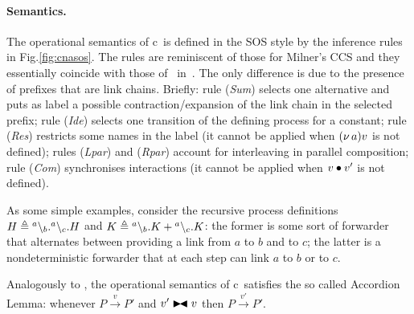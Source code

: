 \paragraph{Semantics.}

The operational semantics of c\CNA\ is defined in the SOS style by the inference rules in Fig.\ref{fig:cnasos}. The rules are reminiscent of those for Milner's CCS and they essentially coincide with those of \CNA\ in~\cite{BBB17}. The only difference is due to the presence of prefixes that are link chains.
Briefly: rule (\textit{Sum}) selects one alternative and puts as label a possible contraction/expansion of the link chain in the selected prefix; rule (\textit{Ide}) selects one transition of the defining process for a constant; rule (\textit{Res}) restricts some names in the label (it cannot be applied when $(\nu\, a)v$ is not defined); rules (\textit{Lpar}) and (\textit{Rpar}) account for interleaving in parallel composition; rule (\textit{Com}) 
synchronises interactions (it cannot be applied when $v \bullet v'$ is not defined).

\begin{example}
As some simple examples, consider the recursive process definitions $H \triangleq {}^{a} \backslash_{b}.{}^{a} \backslash_{c}.H$ and $K \triangleq {}^{a} \backslash_{b}.K + {}^{a} \backslash_{c}.K$: the former is some sort of forwarder that alternates between providing a link from $a$ to $b$ and to $c$; the latter is a nondeterministic forwarder that at each step can link $a$ to $b$ or to $c$. 
\end{example}

Analogously to \CNA, the operational semantics of c\CNA\ satisfies the so called Accordion Lemma: whenever $P \xrightarrow{v} P'$ and $v'\blackstretcheq v$ then $P \xrightarrow{v'} P'$.


